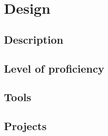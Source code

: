 \section{Design}

\subsection{Description}
\subsection{Level of proficiency}
\subsection{Tools}
\subsection{Projects}

\newpage
